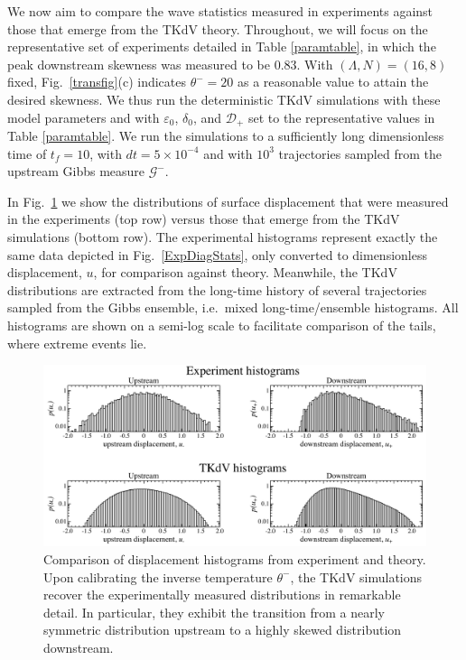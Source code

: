 \documentclass[11pt]{article}
\newcommand{\eps}{\varepsilon}
\newcommand{\lamfac}{N}
\newcommand{\drat}{\mathcal{D}}
\newcommand{\dratdn}{\drat_+}
\newcommand{\epsup}{\eps_0}
\newcommand{\delup}{\delta_0}
\newcommand{\Gibbs}{\mathcal{G}}
\newcommand{\Gup}{\Gibbs^{-}}
\newcommand{\thup}{\theta^{-}}
\begin{document}
	We now aim to compare the wave statistics measured in experiments against those that emerge from the TKdV theory. Throughout, we will focus on the representative set of experiments detailed in Table \ref{paramtable}, in which the peak downstream skewness was measured to be 0.83. 
%
With $(\Lambda, \lamfac) = (16, 8)$ fixed, Fig.~\ref{transfig}(c) indicates $\thup = 20$ as a reasonable value to attain the desired skewness. We thus run the deterministic TKdV simulations with these model parameters and with $\epsup$, $\delup$, and $\dratdn$ set to the representative values in Table \ref{paramtable}. We run the simulations to a sufficiently long dimensionless time of $t_{f} = 10$, with $dt = 5 \times 10^{-4}$ and with $10^3$ trajectories sampled from the upstream Gibbs measure $\Gup$.
	
	In Fig.~\ref{uhist} we show the distributions of surface displacement that were measured in the experiments (top row) versus those that emerge from the TKdV simulations (bottom row). The experimental histograms represent exactly the same data depicted in Fig.~\ref{ExpDiagStats}, only converted to dimensionless displacement, $u$, for comparison against theory. Meanwhile, the TKdV distributions are extracted  from the long-time history of several trajectories sampled from the Gibbs ensemble, i.e.~mixed long-time/ensemble histograms. All histograms are shown on a semi-log scale to facilitate comparison of the tails, where extreme events lie.

\begin{figure}%
\begin{center}
\includegraphics[width = 0.99 \linewidth]{Figs/uhist.pdf}
\caption{ 
Comparison of displacement histograms from experiment and theory. Upon calibrating the inverse temperature $\thup$, the TKdV simulations recover the experimentally measured distributions in remarkable detail. In particular, they exhibit the transition from a nearly symmetric distribution upstream to a highly skewed distribution downstream.
}
\label{uhist}
\end{center}
\end{figure}
 
\end{document}
